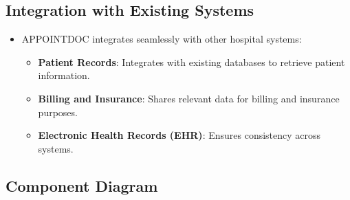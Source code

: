 \documentclass[a4paper, 12pt]{article}
\begin{document}
\subsection{Integration with Existing Systems}
\begin{itemize}
    \item APPOINTDOC integrates seamlessly with other hospital systems:
    \begin{itemize}
        \item \textbf{Patient Records}: Integrates with existing databases to retrieve patient information.
        \item \textbf{Billing and Insurance}: Shares relevant data for billing and insurance purposes.
        \item \textbf{Electronic Health Records (EHR)}: Ensures consistency across systems.
    \end{itemize}
\end{itemize}


\subsection{Component Diagram}
\end{document}

